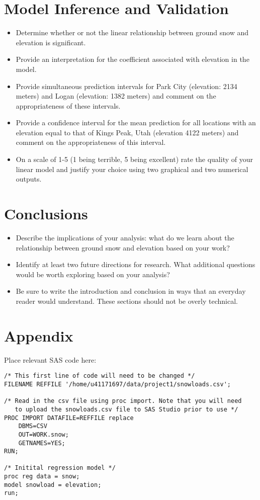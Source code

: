\documentclass[11pt]{article}
\begin{document}
\section{Model Inference and Validation}
\begin{itemize}
\item Determine whether or not the linear relationship between ground snow and elevation is significant. 
\item Provide an interpretation for the coefficient associated with elevation in the model. 
\item Provide simultaneous prediction intervals for Park City (elevation: 2134 meters) and Logan (elevation: 1382 meters) and comment on the appropriateness of these intervals. 
\item Provide a confidence interval for the mean prediction for all locations with an elevation equal to that of Kings Peak, Utah (elevation 4122 meters) and comment on the appropriateness of this interval. 
\item On a scale of 1-5 (1 being terrible, 5 being excellent) rate the quality of your linear model and justify your choice using two graphical and two numerical outputs. 
\end{itemize}

\section{Conclusions}
\begin{itemize}
\item Describe the implications of your analysis: what do we learn about the relationship between ground snow and elevation based on your work?
\item Identify at least two future directions for research. What additional questions would be worth exploring based on your analysis? 
\item Be sure to write the introduction and conclusion in ways that an everyday reader would understand. These sections should not be overly technical. 
\end{itemize}

  


\appendix
\section{Appendix}
Place relevant SAS code here:

\begin{verbatim}
/* This first line of code will need to be changed */
FILENAME REFFILE '/home/u41171697/data/project1/snowloads.csv';

/* Read in the csv file using proc import. Note that you will need
   to upload the snowloads.csv file to SAS Studio prior to use */ 
PROC IMPORT DATAFILE=REFFILE replace
	DBMS=CSV
	OUT=WORK.snow;
	GETNAMES=YES;
RUN;

/* Initital regression model */
proc reg data = snow;
model snowload = elevation;
run;

\end{verbatim}
\end{document}
